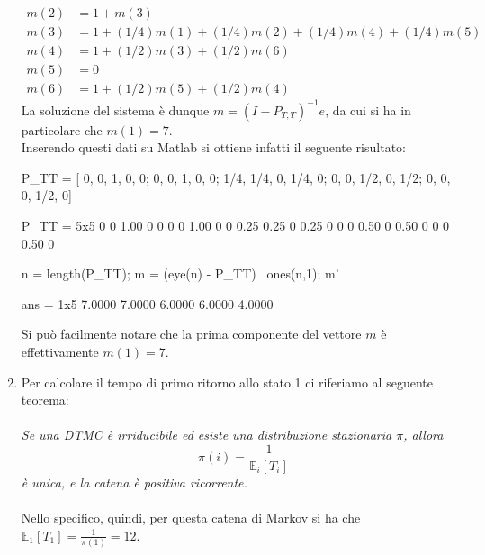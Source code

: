 \documentclass[
	12pt, %
]{fphw}
\begin{document}
\begin{enumerate}
\begin{align*}
		m(2) &= 1 + m(3)\\
		m(3) &= 1 + (1/4)m(1) + (1/4)m(2) + (1/4)m(4) + (1/4)m(5)\\
		m(4) &= 1 + (1/2)m(3) + (1/2)m(6)\\
		m(5) &= 0\\
		m(6) &= 1 + (1/2)m(5) + (1/2)m(4)
	\end{align*}
	La soluzione del sistema è dunque $m = (I - P_{T,T})^{-1}e$, da cui si ha in particolare che $m(1) = 7$.\\
	Inserendo questi dati su Matlab si ottiene infatti il seguente risultato:
	\begin{matlabcode}
		P_TT = [
			0, 0, 1, 0, 0;
			0, 0, 1, 0, 0;
			1/4, 1/4, 0, 1/4, 0;
			0, 0, 1/2, 0, 1/2;
			0, 0, 0, 1/2, 0]
		\end{matlabcode}
		\begin{matlaboutput}
		P_TT = 5x5    
				0         0      1.00      0      0
				0         0      1.00      0      0
				0.25      0.25   0         0.25   0
				0         0      0.50      0      0.50
				0         0      0         0.50   0
		
		\end{matlaboutput}
		\begin{matlabcode}
		n = length(P_TT);
		m = (eye(n) - P_TT) \ ones(n,1);
		m'
		\end{matlabcode}
		\begin{matlaboutput}
		ans = 1x5    
			7.0000    7.0000    6.0000    6.0000    4.0000
		
		\end{matlaboutput}
	
	Si può facilmente notare che la prima componente del vettore $m$ è effettivamente $m(1) = 7$.
	\item Per calcolare il tempo di primo ritorno allo stato 1 ci riferiamo al seguente teorema:\\
	\\
	\null\quad \textit{Se una DTMC è irriducibile ed esiste una distribuzione stazionaria $\pi$, allora
	\begin{equation*}
		\quad\pi(i) = \frac{1}{\mathbb{E}_i [T_i]}
	\end{equation*}
	\null\quad è unica, e la catena è positiva ricorrente.}\\
	\\
	Nello specifico, quindi, per questa catena di Markov si ha che $\mathbb{E}_1 [T_1] = \frac{1}{\pi(1)} = 12$.
\end{enumerate}
\end{document}
